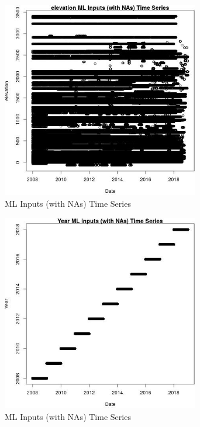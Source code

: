 \begin{figure} 
\centering  
\includegraphics[width=0.77\textwidth]{Code_Outputs/Report_ML_input_PM25_Step4_part_e_de_duplicated_aveswNAs_elevationvDate.jpg} 
\caption{\label{fig:Report_ML_input_PM25_Step4_part_e_de_duplicated_aveswNAselevationvDate}ML Inputs (with NAs) Time Series} 
\end{figure} 
 

\clearpage 

\begin{figure} 
\centering  
\includegraphics[width=0.77\textwidth]{Code_Outputs/Report_ML_input_PM25_Step4_part_e_de_duplicated_aveswNAs_YearvDate.jpg} 
\caption{\label{fig:Report_ML_input_PM25_Step4_part_e_de_duplicated_aveswNAsYearvDate}ML Inputs (with NAs) Time Series} 
\end{figure} 
 

